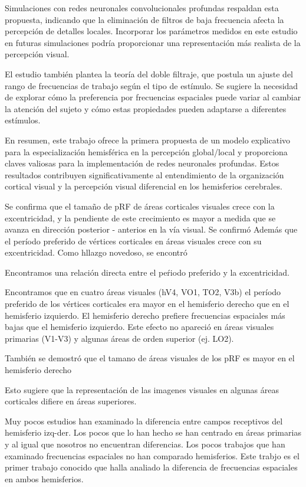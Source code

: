 Simulaciones con redes neuronales convolucionales profundas respaldan esta propuesta, indicando que la eliminación de filtros de baja frecuencia afecta la percepción de detalles locales. Incorporar los parámetros medidos en este estudio en futuras simulaciones podría proporcionar una representación más realista de la percepción visual.

El estudio también plantea la teoría del doble filtraje, que postula un ajuste del rango de frecuencias de trabajo según el tipo de estímulo. Se sugiere la necesidad de explorar cómo la preferencia por frecuencias espaciales puede variar al cambiar la atención del sujeto y cómo estas propiedades pueden adaptarse a diferentes estímulos.

En resumen, este trabajo ofrece la primera propuesta de un modelo explicativo para la especialización hemisférica en la percepción global/local y proporciona claves valiosas para la implementación de redes neuronales profundas. Estos resultados contribuyen significativamente al entendimiento de la organización cortical visual y la percepción visual diferencial en los hemisferios cerebrales.


Se confirma que el tama\~no de pRF de \'areas corticales visuales crece con la excentricidad, y la pendiente de este crecimiento es mayor a medida que se avanza en direcci\'on posterior - anterios en la v\'ia visual. Se confirm\'o Adem\'as que el per\'iodo preferido de v\'ertices corticales en \'areas visuales crece con su excentricidad. Como hllazgo novedoso, se encontr\'o 

Encontramos una relaci\'on directa entre el pe\'riodo preferido y la excentricidad.

Encontramos que en cuatro \'areas visuales (hV4, VO1, TO2, V3b)  el per\'iodo preferido de los v\'ertices corticales era mayor en el hemisferio derecho que en el hemisferio izquierdo. El hemisferio derecho prefiere frecuencias espaciales m\'as bajas que el hemisferio izquierdo. Este efecto no apareci\'o en \'areas visuales primarias (V1-V3) y algunas \'areas de orden superior (ej. LO2).

Tambi\'en se demostr\'o que el tamano de \'areas visuales de los pRF es mayor en el hemisferio derecho 

Esto sugiere que la representaci\'on de las imagenes visuales en algunas \'areas corticales difiere en \'areas superiores.

Muy pocos estudios han examinado la diferencia entre campos receptivos del hemisferio izq-der. Los pocos que lo han hecho se han centrado en \'areas primarias y al igual que nosotros no encuentran diferencias. Los pocos trabajos que han examinado frecuencias espaciales no han comparado hemisferios. Este trabjo es el primer trabajo conocido que halla analiado la diferencia de frecuencias espaciales en ambos hemisferios.

